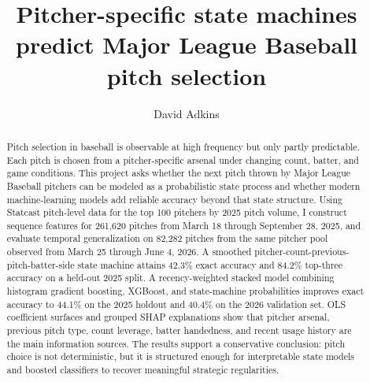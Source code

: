 \documentclass[9pt,twoside]{pnas-new}
\begin{document}
\title{Pitcher-specific state machines predict Major League Baseball pitch selection}

\author[a,1]{David Adkins}




\equalauthors{}

\begin{abstract}
Pitch selection in baseball is observable at high frequency but only partly predictable. Each pitch is chosen from a pitcher-specific arsenal under changing count, batter, and game conditions. This project asks whether the next pitch thrown by Major League Baseball pitchers can be modeled as a probabilistic state process and whether modern machine-learning models add reliable accuracy beyond that state structure. Using Statcast pitch-level data for the top 100 pitchers by 2025 pitch volume, I construct sequence features for 261,620 pitches from March 18 through September 28, 2025, and evaluate temporal generalization on 82,282 pitches from the same pitcher pool observed from March 25 through June 4, 2026. A smoothed pitcher-count-previous-pitch-batter-side state machine attains 42.3\% exact accuracy and 84.2\% top-three accuracy on a held-out 2025 split. A recency-weighted stacked model combining histogram gradient boosting, XGBoost, and state-machine probabilities improves exact accuracy to 44.1\% on the 2025 holdout and 40.4\% on the 2026 validation set. OLS coefficient surfaces and grouped SHAP explanations show that pitcher arsenal, previous pitch type, count leverage, batter handedness, and recent usage history are the main information sources. The results support a conservative conclusion: pitch choice is not deterministic, but it is structured enough for interpretable state models and boosted classifiers to recover meaningful strategic regularities.
\end{abstract}
\end{document}
